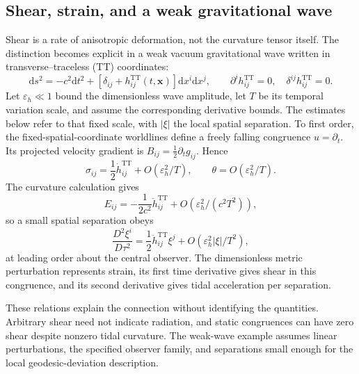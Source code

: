 \documentclass[11pt,oneside]{report}
\newcommand{\TT}{\mathrm{TT}}
\newcommand{\dd}{\mathrm d}
\theoremstyle{remark}
\numberwithin{definition}{chapter}
\numberwithin{proposition}{chapter}
\numberwithin{remark}{chapter}
\begin{document}
\subsection{Shear, strain, and a weak gravitational wave}
Shear is a rate of anisotropic deformation, not the curvature tensor itself. The distinction becomes explicit in a weak vacuum gravitational wave written in transverse--traceless (TT) coordinates:
\begin{equation}
\dd s^2=-c^2\dd t^2+
[\delta_{ij}+h^{\TT}_{ij}(t,\mathbf x)]\dd x^i\dd x^j,
\qquad \partial^i h^{\TT}_{ij}=0,\quad \delta^{ij}h^{\TT}_{ij}=0.
\label{geometry:eq:ttmetric}
\end{equation}
Let $\varepsilon_h\ll1$ bound the dimensionless wave amplitude, let $T$ be its temporal variation scale, and assume the corresponding derivative bounds. The estimates below refer to that fixed scale, with $|\xi|$ the local spatial separation. To first order, the fixed-spatial-coordinate worldlines define a freely falling congruence $u=\partial_t$. Its projected velocity gradient is
$B_{ij}=\tfrac12\partial_tg_{ij}$. Hence
\begin{equation}
\sigma_{ij}=\frac12\dot h^{\TT}_{ij}+O(\varepsilon_h^2/T),\qquad
\theta=O(\varepsilon_h^2/T).
\end{equation}
The curvature calculation gives
\begin{equation}
E_{ij}=-\frac{1}{2c^2}\ddot h^{\TT}_{ij}+O(\varepsilon_h^2/(c^2T^2)),
\end{equation}
so a small spatial separation obeys
\begin{equation}
\frac{D^2\xi^i}{D\tau^2}
=\frac12\ddot h^{\TT}_{ij}\xi^j+O(\varepsilon_h^2|\xi|/T^2),
\end{equation}
at leading order about the central observer. The dimensionless metric perturbation represents strain, its first time derivative gives shear in this congruence, and its second derivative gives tidal acceleration per separation.

These relations explain the connection without identifying the quantities. Arbitrary shear need not indicate radiation, and static congruences can have zero shear despite nonzero tidal curvature. The weak-wave example assumes linear perturbations, the specified observer family, and separations small enough for the local geodesic-deviation description.
\end{document}
